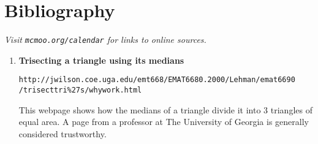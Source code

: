 \documentclass[letterpaper,12pt,twoside]{article}
\begin{document}
	\pagestyle{fancy}
	
		\section*{Bibliography} \textit{Visit \texttt{mcmoo.org/calendar} for links to online sources.}
	
	\vspace{1cm}
		\begin{enumerate}
			\item \textbf{Trisecting a triangle using its medians} \par\texttt{http://jwilson.coe.uga.edu/emt668/EMAT6680.2000/Lehman/emat6690\\/trisecttri\%27s/whywork.html}\par This webpage shows how the medians of a triangle divide it into 3 triangles of equal area. A page from a professor at The University of Georgia is generally considered trustworthy.
		\end{enumerate}
\end{document}

